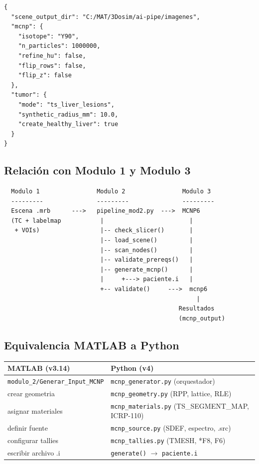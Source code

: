 \documentclass[12pt,a4paper]{article}
\begin{document}
\begin{lstlisting}
{
  "scene_output_dir": "C:/MAT/3Dosim/ai-pipe/imagenes",
  "mcnp": {
    "isotope": "Y90",
    "n_particles": 1000000,
    "refine_hu": false,
    "flip_rows": false,
    "flip_z": false
  },
  "tumor": {
    "mode": "ts_liver_lesions",
    "synthetic_radius_mm": 10.0,
    "create_healthy_liver": true
  }
}
\end{lstlisting}

\subsection{Relación con Modulo 1 y Modulo 3}

\begin{lstlisting}
  Modulo 1                Modulo 2                Modulo 3
  ---------               ---------               ---------
  Escena .mrb      --->   pipeline_mod2.py  --->  MCNP6
  (TC + labelmap           |                        |
   + VOIs)                 |-- check_slicer()       |
                           |-- load_scene()         |
                           |-- scan_nodes()         |
                           |-- validate_prereqs()   |
                           |-- generate_mcnp()      |
                           |     +---> paciente.i   |
                           +-- validate()     --->  mcnp6
                                                      |
                                                 Resultados
                                                 (mcnp_output)
\end{lstlisting}

\subsection{Equivalencia MATLAB a Python}

\begin{center}
\begin{tabular}{ll}
\toprule
\textbf{MATLAB (v3.14)} & \textbf{Python (v4)} \\
\midrule
\texttt{modulo\_2/Generar\_Input\_MCNP} & \texttt{mcnp\_generator.py} (orquestador) \\
\quad crear geometria & \texttt{mcnp\_geometry.py} (RPP, lattice, RLE) \\
\quad asignar materiales & \texttt{mcnp\_materials.py} (TS\_SEGMENT\_MAP, ICRP-110) \\
\quad definir fuente & \texttt{mcnp\_source.py} (SDEF, espectro, .src) \\
\quad configurar tallies & \texttt{mcnp\_tallies.py} (TMESH, *F8, F6) \\
\quad escribir archivo .i & \texttt{generate()} $\to$ \texttt{paciente.i} \\
\bottomrule
\end{tabular}
\end{center}
\end{document}
